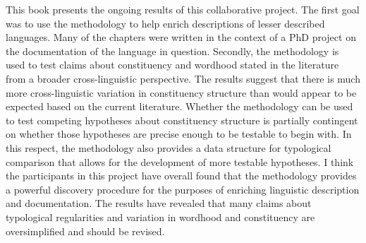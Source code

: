 \documentclass[output=paper,hidelinks]{langscibook}
\begin{document}
This book presents the ongoing results of this collaborative project. The first goal was to use the methodology to help enrich descriptions of lesser described languages. Many of the chapters were written in the context of a PhD project on the documentation of the language in question. Secondly, the methodology is used to test claims about constituency and wordhood stated in the literature from a broader cross-linguistic perspective. The results suggest that there is much more cross-linguistic variation in constituency structure than would appear to be expected based on the current literature. Whether the methodology can be used to test competing hypotheses about constituency structure is partially contingent on whether those hypotheses are precise enough to be testable to begin with. In this respect, the methodology also provides a data structure for typological comparison that allows for the development of more testable hypotheses. I think the participants in this project have overall found that the methodology provides a powerful discovery procedure for the purposes of enriching linguistic description and documentation. The results have revealed that many claims about typological regularities and variation in wordhood and constituency are oversimplified and should be revised. 






\end{document}
